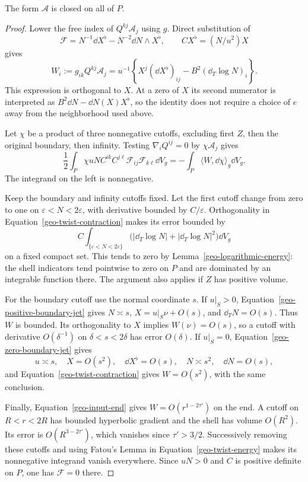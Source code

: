 \begin{lemma}
\label{geo-vanishing-twist}
The form $\mathcal A$ is closed on all of $P$.
\end{lemma}
\begin{proof}
Lower the free index of $Q^{kj}\mathcal A_j$ using $g$.  Direct substitution
of
\[
 \mathcal F=N^{-1}\dd X^\flat-N^{-2}\dd N\wedge X^\flat,
 \qquad C X^\flat=(N/u^2)X
\]
gives
\begin{equation}
 W_i:=g_{ik}Q^{kj}\mathcal A_j
  =u^{-1}\left\{X^j(\dd X^\flat)_{ij}
                    -B^2(\dd_T\log N)_i\right\}.
 \label{geo-twist-contraction}
\end{equation}
This expression is orthogonal to $X$.  At a zero of $X$ its second numerator
is interpreted as $B^2\dd N-\dd N(X)X^\flat$, so the identity does not
require a choice of $e$ away from the neighborhood used above.

Let $\chi$ be a product of three nonnegative cutoffs, excluding first $Z$,
then the original boundary, then infinity.  Testing $\nabla_iQ^{ij}=0$ by
$\chi\mathcal A_j$ gives
\begin{equation}
 \frac12\int_P\chi uN C^{ik}C^{j\ell}
                 \mathcal F_{ij}\mathcal F_{k\ell}\dd V_g
       =-\int_P\langle W,\dd\chi\rangle_g\dd V_g.
 \label{geo-twist-energy}
\end{equation}
The integrand on the left is nonnegative.

Keep the boundary and infinity cutoffs fixed.  Let the first cutoff change
from zero to one on $\varepsilon<N<2\varepsilon$, with derivative bounded
by $C/\varepsilon$.  Orthogonality in
Equation~\eqref{geo-twist-contraction} makes its error bounded by
\[
 C\int_{\{\varepsilon<N<2\varepsilon\}}
       \bigl(|\dd_T\log N|+|\dd_T\log N|^2\bigr)\dd V_g
\]
on a fixed compact set.  This tends to zero by
Lemma~\ref{geo-logarithmic-energy}: the shell indicators tend pointwise to
zero on $P$ and are dominated by an integrable function there.  The argument
also applies if $Z$ has positive volume.

For the boundary cutoff use the normal coordinate $s$.  If $u|_S>0$,
Equation~\eqref{geo-positive-boundary-jet} gives $N\asymp s$,
$X=u|_S\nu+O(s)$, and $\dd_TN=O(s)$.  Thus $W$ is bounded.  Its
orthogonality to $X$ implies $W(\nu)=O(s)$, so a cutoff with derivative
$O(\delta^{-1})$ on $\delta<s<2\delta$ has error $O(\delta)$.  If $u|_S=0$,
Equation~\eqref{geo-zero-boundary-jet} gives
\[
 u\asymp s,\quad X=O(s^2),\quad \dd X^\flat=O(s),
 \quad N\asymp s^2,\quad \dd N=O(s),
\]
and Equation~\eqref{geo-twist-contraction} gives $W=O(s^2)$, with the same
conclusion.

Finally, Equation~\eqref{geo-input-end} gives
$W=O(r^{1-2\tau'})$ on the end.  A cutoff on $R<r<2R$ has bounded
hyperbolic gradient and the shell has volume $O(R^2)$.  Its error is
$O(R^{3-2\tau'})$, which vanishes since $\tau'>3/2$.  Successively removing
these cutoffs and using Fatou's Lemma in
Equation~\eqref{geo-twist-energy} makes its nonnegative integrand vanish
everywhere.  Since $uN>0$ and $C$ is positive definite on $P$, one has
$\mathcal F=0$ there.
\end{proof}

